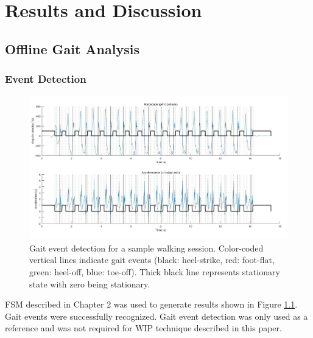 
\chapter{Results and Discussion} %

\label{Chapter3} %


\section{Offline Gait Analysis}

\subsection{Event Detection}

\begin{figure}[th]
\captionsetup{justification=raggedright,singlelinecheck=false}
\centering
\includegraphics[width=\textwidth,height=\textheight,keepaspectratio]{Figures/gait_event_detection_results.jpg}
\decoRule
\caption[Gait event detection results]{Gait event detection for a sample walking session. Color-coded vertical lines indicate gait events (black: heel-strike, red: foot-flat, green: heel-off, blue: toe-off). Thick black line represents stationary state with zero being stationary.}
\label{fig:gait_event_detection_results}
\end{figure}
\noindent
FSM described in Chapter 2 was used to generate results shown in Figure \ref{fig:gait_event_detection_results}. Gait events were successfully recognized. Gait event detection was only used as a reference and was not required for WIP technique described in this paper.


